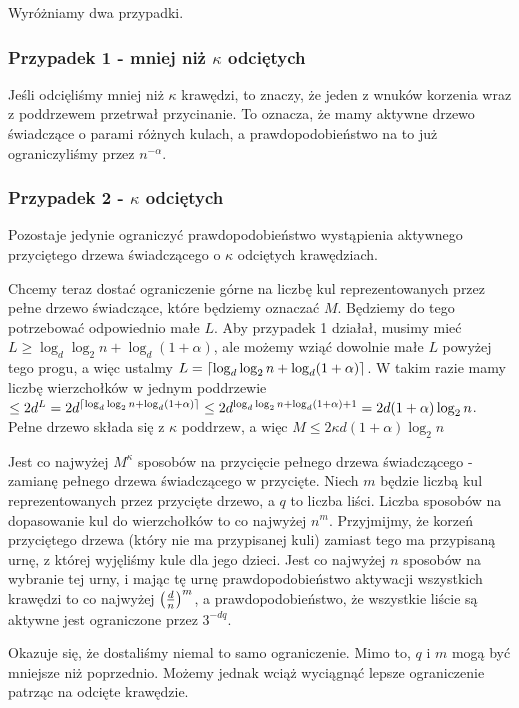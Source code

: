 Wyróżniamy dwa przypadki.

\subsubsection*{Przypadek 1 - mniej niż \(\kappa\) odciętych}

Jeśli odcięliśmy mniej niż \(\kappa\) krawędzi, to znaczy, że jeden z wnuków korzenia wraz z poddrzewem przetrwał przycinanie.
To oznacza, że mamy aktywne drzewo świadczące o parami różnych kulach, a prawdopodobieństwo na to już ograniczyliśmy przez \(n^{-\alpha}\).

\subsubsection*{Przypadek 2 - \(\kappa\) odciętych}

Pozostaje jedynie ograniczyć prawdopodobieństwo wystąpienia aktywnego przyciętego drzewa świadczącego o \(\kappa\) odciętych krawędziach.

Chcemy teraz dostać ograniczenie górne na liczbę kul reprezentowanych przez pełne drzewo świadczące, które będziemy oznaczać \(M\). Będziemy do tego potrzebować odpowiednio małe \(L\). Aby przypadek 1 działał, musimy mieć \(L \geq \log_d \log_2 n + \log_d(1 + \alpha)\), ale możemy wziąć dowolnie małe \(L\) powyżej tego progu, a więc ustalmy \(L = \left\lceil\log_d \log_2 n + \log_d(1 + \alpha)\right\rceil\). W takim razie mamy liczbę wierzchołków w jednym poddrzewie \(\leq 2 d^L = 2 d^{\left\lceil\log_d \log_2 n + \log_d(1 + \alpha)\right\rceil} \leq 2d^{\log_d \log_2 n + \log_d(1 + \alpha) + 1} = 2 d (1 + \alpha)\log_2 n \). Pełne drzewo składa się z \(\kappa\) poddrzew, a więc \(M \leq 2 \kappa d (1 + \alpha)\log_2 n \)

Jest co najwyżej \(M^\kappa\) sposobów na przycięcie pełnego drzewa świadczącego - zamianę pełnego drzewa świadczącego w przycięte.
Niech \(m\) będzie liczbą kul reprezentowanych przez przycięte drzewo, a \(q\) to liczba liści. Liczba sposobów na dopasowanie kul do wierzchołków to co najwyżej \(n^m\).
Przyjmijmy, że korzeń przyciętego drzewa (który nie ma przypisanej kuli) zamiast tego ma przypisaną urnę, z której wyjęliśmy kule dla jego dzieci.
Jest co najwyżej \(n\) sposobów na wybranie tej urny, i mając tę urnę prawdopodobieństwo aktywacji wszystkich krawędzi to co najwyżej \(\left(\frac{d}{n}\right)^m\), a prawdopodobieństwo, że wszystkie liście są aktywne jest ograniczone przez \(3^{-dq}\).

Okazuje się, że dostaliśmy niemal to samo ograniczenie. Mimo to, \(q\) i \(m\) mogą być mniejsze niż poprzednio.
Możemy jednak wciąż wyciągnąć lepsze ograniczenie patrząc na odcięte krawędzie.

